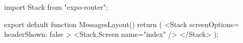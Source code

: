 import { Stack } from "expo-router";

export default function MessagesLayout() {
  return (
    <Stack screenOptions={{ headerShown: false }}>
      <Stack.Screen name="index" />
    </Stack>
  );
}
